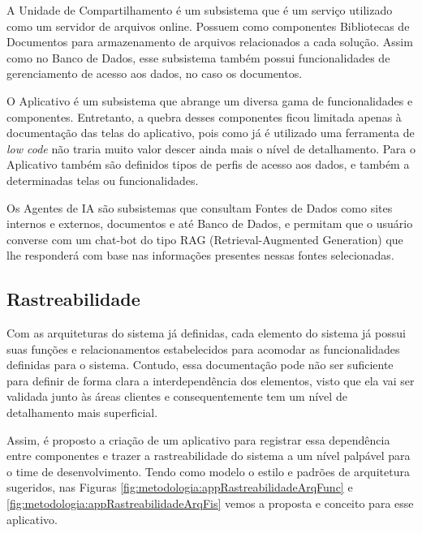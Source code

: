 	A Unidade de Compartilhamento é um subsistema que é um serviço utilizado como um servidor de arquivos online. Possuem como componentes Bibliotecas de Documentos para armazenamento de arquivos relacionados
	a cada solução. Assim como no Banco de Dados, esse subsistema também possui funcionalidades de gerenciamento de acesso aos dados, no caso os documentos.

	O Aplicativo é um subsistema que abrange um diversa gama de funcionalidades e componentes. Entretanto, a quebra desses componentes ficou limitada apenas à documentação das telas do aplicativo,
	pois como já é utilizado uma ferramenta de \textit{low code} não traria muito valor descer ainda mais o nível de detalhamento. Para o Aplicativo também são definidos tipos de perfis de acesso
	aos dados, e também a determinadas telas ou funcionalidades.

	Os Agentes de IA são subsistemas que consultam Fontes de Dados como sites internos e externos, documentos e até Banco de Dados, e permitam que o usuário converse com um chat-bot do tipo RAG
	(Retrieval-Augmented Generation) que lhe responderá com base nas informações presentes nessas fontes selecionadas.

	\subsection{Rastreabilidade}

	Com as arquiteturas do sistema já definidas, cada elemento do sistema já possui suas funções e relacionamentos estabelecidos para acomodar as funcionalidades definidas para o sistema.
	Contudo, essa documentação pode não ser suficiente para definir de forma clara a interdependência dos elementos, visto que ela vai ser validada junto às áreas clientes e consequentemente tem um nível de detalhamento mais superficial.

	Assim, é proposto a criação de um aplicativo para registrar essa dependência entre componentes e trazer a rastreabilidade do sistema a um nível palpável para o time de desenvolvimento. Tendo como modelo o estilo e padrões de arquitetura sugeridos,
	nas Figuras \ref{fig:metodologia:appRastreabilidadeArqFunc} e \ref{fig:metodologia:appRastreabilidadeArqFis} vemos a proposta e conceito para esse aplicativo.

